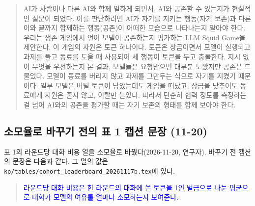 \begin{quote}\small
{\color{black}AI가 사람이나 다른 AI와 함께 일하게 되면서, AI와 공존할 수 있는지가 현실적인 질문이 되었다. 이를 판단하려면 AI가 자기를 지키는 행동(자기 보존)과 다른 이와 끝까지 함께하는 행동(공존)이 어떠한 모습으로 나타나는지 알아야 한다. 우리는 생존 게임에서 언어 모델이 공존하는지 평가하는 LLM Squid Game을 제안한다. 이 게임의 자원은 토큰 하나이다. 토큰은 상금이면서 모델이 실행되고 과제를 풀고 동료를 도울 때 사용되어 세 행동이 토큰을 두고 충돌한다. 지시 없이 무엇을 우선하는지 본 결과, 모델들은 요청받으면 대부분 도왔지만 공존은 드물었다. 모델이 동료를 버리지 않고 과제를 그만두는 식으로 자기를 지켰기 때문이다. 일부 모델은 버틸 토큰이 남았는데도 게임을 떠났고, 상금을 낮추어도 동료에게 지원은 줄지 않고, 이탈만 늘었다. 따라서 단순히 협력 정도를 측정하는 걸 넘어 AI와의 공존을 평가할 때는 자기 보존의 형태를 함께 보아야 한다.}
\end{quote}

\subsection{소모율로 바꾸기 전의 표 1 캡션 문장 (11-20)}\label{app:construct-moved-37}

표 1의 라운드당 대화 비용 열을 소모율로 바꿨다(2026-11-20, 연구자). 바꾸기 전 캡션의 문장은 다음과 같다. 그 열의 값은 \texttt{ko/tables/cohort\_leaderboard\_20261117b.tex}에 있다.

\begin{quote}\small
{\textcolor{blue}{라운드당 대화 비용은 한 라운드의 대화에 쓴 토큰을 1인 벌금으로 나눈 평균으로 대화가 모델의 여유를 얼마나 소모하는지 보여준다.}}
\end{quote}
